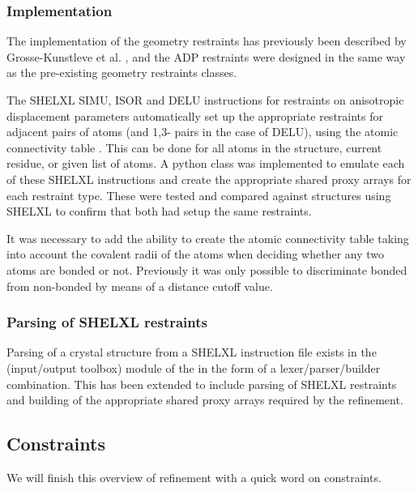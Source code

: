 \documentclass[12pt]{article}
\begin{document}

\subsubsection{Implementation}

The implementation of the geometry restraints has previously been described by Grosse-Kunstleve et al. \cite{cctbxnews:2004b}, and the ADP restraints were designed in the same way as the pre-existing geometry restraints classes.

The SHELXL SIMU, ISOR and DELU instructions for restraints on anisotropic displacement parameters automatically set up the appropriate restraints for adjacent pairs of atoms (and 1,3- pairs in the case of DELU), using the atomic connectivity table \cite{SHELX:man97}. This can be done for all atoms in the structure, current residue, or given list of atoms. A python class was implemented to emulate each of these SHELXL instructions and create the appropriate shared proxy arrays for each restraint type. These were tested and compared against structures using SHELXL to confirm that both had setup the same restraints.

It was necessary to add the ability to create the \cctbx atomic connectivity table taking into account the covalent radii of the atoms when deciding whether any two atoms are bonded or not. Previously it was only possible to discriminate bonded from non-bonded by means of a distance cutoff value.




\subsubsection{Parsing of SHELXL restraints}

Parsing of a crystal structure from a SHELXL instruction file exists in the \iotbx (input/output toolbox) module of the \cctbx in the form of a lexer/parser/builder combination. This has been extended to include parsing of SHELXL restraints and building of the appropriate shared proxy arrays required by the refinement.

\subsection{Constraints}

We will finish this overview of refinement with a quick word on constraints.
\end{document}
